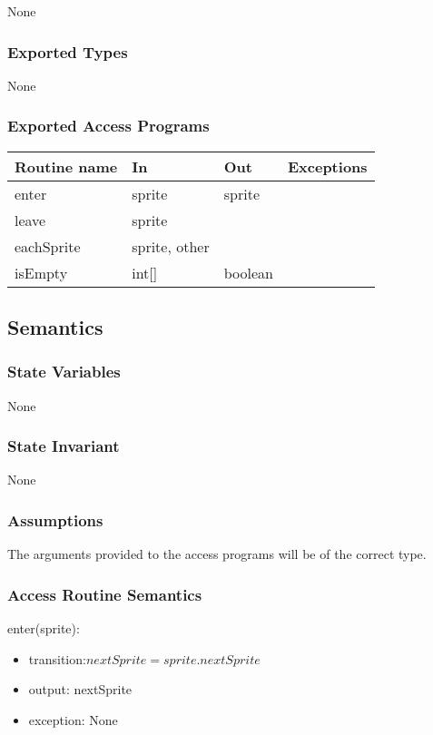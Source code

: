 \documentclass[12pt]{article}
\begin{document}
None

\subsubsection* {Exported Types}

None 

\subsubsection* {Exported Access Programs}

\begin{tabular}{| l | l | l | p{5cm} |}
\hline
\textbf{Routine name} & \textbf{In} & \textbf{Out} & \textbf{Exceptions}\\
\hline
enter & sprite & sprite  & ~\\
\hline
leave & sprite & ~& ~ \\
\hline
eachSprite &sprite, other & ~  & ~\\
\hline
isEmpty & int[] & boolean & ~ \\
\hline
\end{tabular}

\subsection* {Semantics}

\subsubsection* {State Variables}
None


\subsubsection* {State Invariant}
None

\subsubsection* {Assumptions}

The arguments provided to the access programs will be of the correct type.

\subsubsection* {Access Routine Semantics}

\noindent  enter(sprite):
\begin{itemize}
\item transition:$nextSprite = sprite.nextSprite$
\item output: nextSprite
\item exception: None
\end{itemize}
\end{document}
